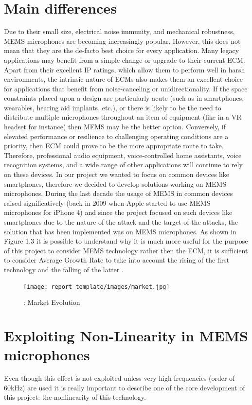 \section{Main differences}
Due to their small size, electrical noise immunity, and mechanical robustness, MEMS microphones are becoming increasingly popular. However, this does not mean that they are the de-facto best choice for every application. Many legacy applications may benefit from a simple change or upgrade to their current ECM. Apart from their excellent IP ratings, which allow them to perform well in harsh environments, the intrinsic nature of ECMs also makes them an excellent choice for applications that benefit from noise-canceling or unidirectionality.
\newpage
If the space constraints placed upon a design are particularly acute (such as in smartphones, wearables, hearing aid implants, etc.), or there is likely to be the need to distribute multiple microphones throughout an item of equipment (like in a VR headset for instance) then MEMS may be the better option.
Conversely, if elevated performance or resilience to challenging operating conditions are a priority, then ECM could prove to be the more appropriate route to take. Therefore, professional audio equipment, voice-controlled home assistants, voice recognition systems, and a wide range of other applications will continue to rely on these devices.
\newline
\newline
In our project we wanted to focus on common devices like smartphones, therefore we decided to develop solutions working on MEMS microphones.
 During the last decade the usage of MEMS in common devices raised significatively (back in 2009 when Apple started to use MEMS microphones for iPhone 4) and since the project focused on such devices like smartphones due to the nature of the attack and the target of the attacks, the solution that has been implemented was on MEMS microphones.
 As shown in Figure 1.3 it is possible to understand why it is much more useful for the purpose of this project to consider MEMS technology rather then the ECM, it is sufficient to consider Average Growth Rate to take into account the rising of the first technology and the falling of the latter
 .
\newline
 \begin{figure}[H]
    \centering
    \texttt{[image: report\_template/images/market.jpg]}
    \caption{: Market Evolution}
    \label{fig:market}
\end{figure}
\section{Exploiting Non-Linearity in MEMS microphones}
Even though this effect is not exploited unless very high frequencies (order of 60kHz) are used it is really important to describe one of the core development of this project: the nonlinearity of this technology.

